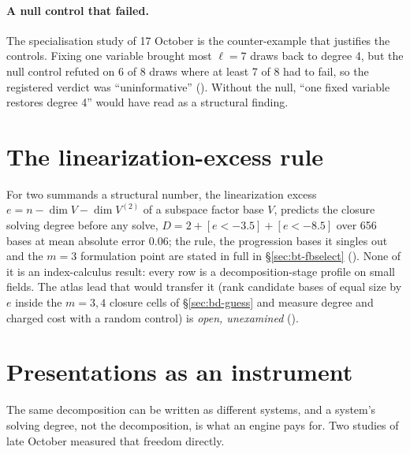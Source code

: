 \paragraph{A null control that failed.} The specialisation study of 17
October is the counter-example that justifies the controls. Fixing one
variable brought most $\ell=7$ draws back to degree 4, but the null control
refuted on 6 of 8 draws where at least 7 of 8 had to fail, so the registered
verdict was ``uninformative''
(). Without the
null, ``one fixed variable restores degree 4'' would have read as a
structural finding.

\section{The linearization-excess rule}\label{sec:in-excess}

For two summands a structural number, the linearization excess
$e=n-\dim V-\dim V^{(2)}$ of a subspace factor base $V$, predicts the
closure solving degree before any solve, $D=2+[e<-3.5]+[e<-8.5]$ over 656
bases at mean absolute error $0.06$; the rule, the progression bases it
singles out and the $m=3$ formulation point are stated in full in
\S\ref{sec:bt-fbselect} ().
None of it is an index-calculus result: every row is a decomposition-stage
profile on small fields. The atlas lead that would transfer it (rank
candidate bases of equal size by $e$ inside the $m=3,4$ closure cells of
\S\ref{sec:bd-guess} and measure degree and charged cost with a random
control) is \emph{open, unexamined}
().

\section{Presentations as an instrument}\label{sec:in-presentation}

The same decomposition can be written as different systems, and a system's
solving degree, not the decomposition, is what an engine pays for. Two
studies of late October measured that freedom directly.

